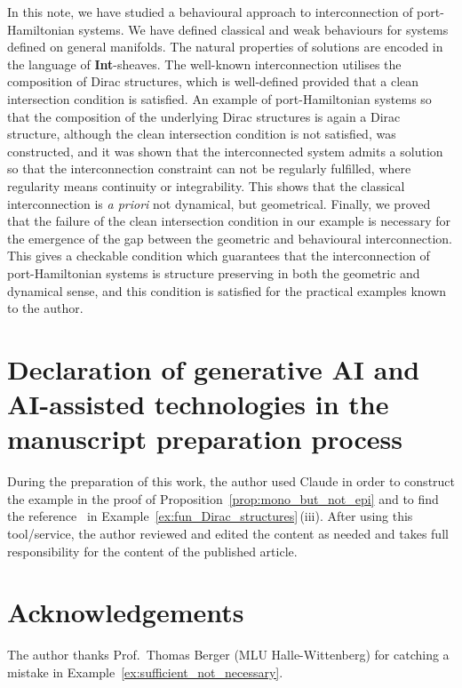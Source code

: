 \documentclass[preprint,12pt]{elsarticle}
\theoremstyle{definition}
\begin{document}
In this note, we have studied a behavioural approach to interconnection of port-Hamiltonian systems. We have defined classical and weak behaviours for systems defined on general manifolds. The natural properties of solutions are encoded in the language of \textbf{Int}-sheaves. The well-known interconnection utilises the composition of Dirac structures, which is well-defined provided that a clean intersection condition is satisfied. An example of port-Hamiltonian systems so that the composition of the underlying Dirac structures is again a Dirac structure, although the clean intersection condition is not satisfied, was constructed, and it was shown that the interconnected system admits a solution so that the interconnection constraint can not be regularly fulfilled, where regularity means continuity or integrability. This shows that the classical interconnection is \textit{a priori} not dynamical, but geometrical. Finally, we proved that the failure of the clean intersection condition in our example is necessary for the emergence of the gap between the geometric and behavioural interconnection. This gives a checkable condition which guarantees that the interconnection of port-Hamiltonian systems is structure preserving in both the geometric and dynamical sense, and this condition is satisfied for the practical examples known to the author.

\section*{Declaration of generative AI and AI-assisted technologies in the manuscript preparation process}

During the preparation of this work, the author used Claude in order to construct the example in the proof of Proposition~\ref{prop:mono_but_not_epi} and to find the reference~\cite{EtayGoNiSant26} in Example~\ref{ex:fun_Dirac_structures}\,(iii). After using this tool/service, the author reviewed and edited the content as needed and takes full responsibility for the content of the published article.

\section*{Acknowledgements}

The author thanks Prof.~Thomas Berger (MLU Halle-Wittenberg) for catching a mistake in Example~\ref{ex:sufficient_not_necessary}.



\end{document}
